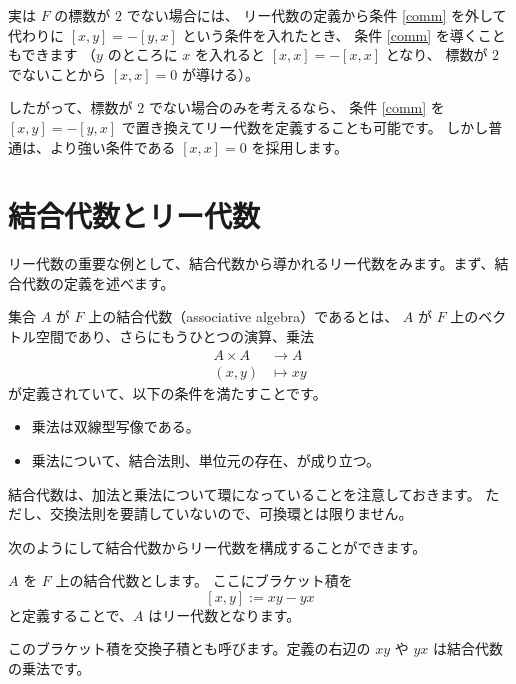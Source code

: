 \documentclass{ltjsarticle}
\begin{document}
実は \(F\) の標数が \(2\) でない場合には、
リー代数の定義から条件 \ref{comm} を外して代わりに \([x, y] = -[y, x]\) という条件を入れたとき、
条件 \ref{comm} を導くこともできます
（\(y\) のところに \(x\) を入れると \([x, x] = -[x, x]\) となり、
標数が \(2\) でないことから \([x, x] = 0\) が導ける）。

したがって、標数が \(2\) でない場合のみを考えるなら、
条件 \ref{comm} を \([x, y] = -[y, x]\) で置き換えてリー代数を定義することも可能です。
しかし普通は、より強い条件である \([x, x] = 0\) を採用します。

\section{結合代数とリー代数}

リー代数の重要な例として、結合代数から導かれるリー代数をみます。まず、結合代数の定義を述べます。

\begin{usmdefinition}[結合代数]
    集合 \(A\) が \(F\) 上の結合代数（associative algebra）であるとは、
    \(A\) が \(F\) 上のベクトル空間であり、さらにもうひとつの演算、乗法
    \begin{align*}
        A \times A & \to A      \\
        (x, y)     & \mapsto xy
    \end{align*}
    が定義されていて、以下の条件を満たすことです。
    \begin{itemize}
        \item 乗法は双線型写像である。
        \item 乗法について、結合法則、単位元の存在、が成り立つ。
    \end{itemize}
\end{usmdefinition}

結合代数は、加法と乗法について環になっていることを注意しておきます。
ただし、交換法則を要請していないので、可換環とは限りません。

次のようにして結合代数からリー代数を構成することができます。

\begin{usmexample}[結合代数から導かれるリー代数]\label{commutator}
    \(A\) を \(F\) 上の結合代数とします。
    ここにブラケット積を
    \[
        [x, y] := xy - yx
    \]
    と定義することで、\(A\) はリー代数となります。
\end{usmexample}

このブラケット積を交換子積とも呼びます。定義の右辺の \(xy\) や \(yx\) は結合代数の乗法です。
\end{document}
